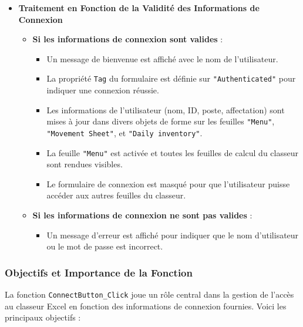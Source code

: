\documentclass[a4paper, oneside, 12pt, final]{extreport}
\begin{document}
\begin{itemize}
    \item \textbf{Traitement en Fonction de la Validité des Informations de Connexion}
    \begin{itemize}
        \item \textbf{Si les informations de connexion sont valides} :
        \begin{itemize}
            \item Un message de bienvenue est affiché avec le nom de l'utilisateur.
            \item La propriété \texttt{Tag} du formulaire est définie sur \texttt{"Authenticated"} pour indiquer une connexion réussie.
            \item Les informations de l'utilisateur (nom, ID, poste, affectation) sont mises à jour dans divers objets de forme sur les feuilles \texttt{"Menu"}, \texttt{"Movement Sheet"}, et \texttt{"Daily inventory"}.
            \item La feuille \texttt{"Menu"} est activée et toutes les feuilles de calcul du classeur sont rendues visibles.
            \item Le formulaire de connexion est masqué pour que l'utilisateur puisse accéder aux autres feuilles du classeur.
        \end{itemize}

        \item \textbf{Si les informations de connexion ne sont pas valides} :
        \begin{itemize}
            \item Un message d'erreur est affiché pour indiquer que le nom d'utilisateur ou le mot de passe est incorrect.
        \end{itemize}
    \end{itemize}
\end{itemize}

\subsubsection{Objectifs et Importance de la Fonction}

La fonction \texttt{ConnectButton\_Click} joue un rôle central dans la gestion de l'accès au classeur Excel en fonction des informations de connexion fournies. Voici les principaux objectifs :
\end{document}
